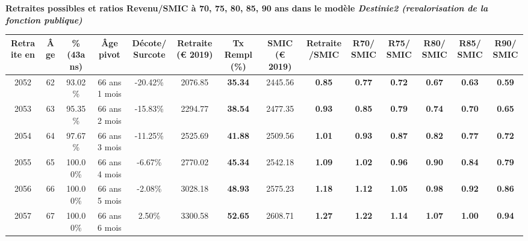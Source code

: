  \vspace{0.1cm} 
{\bf \noindent Retraites possibles et ratios Revenu/SMIC à 70, 75, 80, 85, 90 ans dans le modèle \emph{Destinie2 (revalorisation de la fonction publique)}}  
 
\begin{adjustbox}{max width=\textwidth} 
\begin{tabular}[htb]{|c|c||c|c|c||c|c||c|c||c|c|c|c|c|} 
\hline 
 Retraite en &  Âge &  \%(43ans) &  Âge pivot &  Décote/Surcote &  Retraite (\euro{} 2019) &  Tx Rempl(\%) &  SMIC (\euro{} 2019) &  Retraite/SMIC &  R70/SMIC &  R75/SMIC &  R80/SMIC &  R85/SMIC &  R90/SMIC \\ 
\hline \hline 
 2052 &  62 &  93.02\% &  66 ans 1 mois &  -20.42\% &  2076.85 &  {\bf 35.34} &  2445.56 &  {\bf {\color{red} 0.85}} &  {\bf {\color{red} 0.77}} &  {\bf {\color{red} 0.72}} &  {\bf {\color{red} 0.67}} &  {\bf {\color{red} 0.63}} &  {\bf {\color{red} 0.59}} \\ 
\hline 
 2053 &  63 &  95.35\% &  66 ans 2 mois &  -15.83\% &  2294.77 &  {\bf 38.54} &  2477.35 &  {\bf {\color{red} 0.93}} &  {\bf {\color{red} 0.85}} &  {\bf {\color{red} 0.79}} &  {\bf {\color{red} 0.74}} &  {\bf {\color{red} 0.70}} &  {\bf {\color{red} 0.65}} \\ 
\hline 
 2054 &  64 &  97.67\% &  66 ans 3 mois &  -11.25\% &  2525.69 &  {\bf 41.88} &  2509.56 &  {\bf 1.01} &  {\bf {\color{red} 0.93}} &  {\bf {\color{red} 0.87}} &  {\bf {\color{red} 0.82}} &  {\bf {\color{red} 0.77}} &  {\bf {\color{red} 0.72}} \\ 
\hline 
 2055 &  65 &  100.00\% &  66 ans 4 mois &  -6.67\% &  2770.02 &  {\bf 45.34} &  2542.18 &  {\bf 1.09} &  {\bf 1.02} &  {\bf {\color{red} 0.96}} &  {\bf {\color{red} 0.90}} &  {\bf {\color{red} 0.84}} &  {\bf {\color{red} 0.79}} \\ 
\hline 
 2056 &  66 &  100.00\% &  66 ans 5 mois &  -2.08\% &  3028.18 &  {\bf 48.93} &  2575.23 &  {\bf 1.18} &  {\bf 1.12} &  {\bf 1.05} &  {\bf {\color{red} 0.98}} &  {\bf {\color{red} 0.92}} &  {\bf {\color{red} 0.86}} \\ 
\hline 
 2057 &  67 &  100.00\% &  66 ans 6 mois &  2.50\% &  3300.58 &  {\bf 52.65} &  2608.71 &  {\bf 1.27} &  {\bf 1.22} &  {\bf 1.14} &  {\bf 1.07} &  {\bf 1.00} &  {\bf {\color{red} 0.94}} \\ 
\hline 
\hline 
\end{tabular} 
\end{adjustbox} 
 
 \vspace{0.1cm} 

